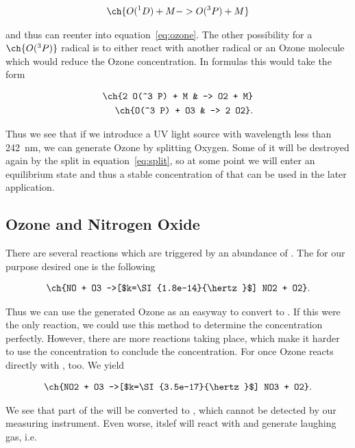 \begin{align*}
  \ch{O(^1 D) + M -> O(^3 P) + M}
\end{align*}

and thus can reenter into equation~\eqref{eq:ozone}. The other
possibility for a $\ch{O(^3 P)}$ radical is to either react with
another radical or an Ozone molecule which would reduce the Ozone
concentration. In formulas this would take the form

\begin{align*}
  \ch{2 O(^3 P) + M & -> O2 + M}\\
  \ch{O(^3 P) + O3 & -> 2 O2}.
\end{align*}

Thus we see that if we introduce a UV light source with wavelength
less than \SI{242}{\nano\meter}, we can generate Ozone
by splitting Oxygen. Some of it will be destroyed again by the split
in equation~\eqref{eq:split}, so at some point we will enter an
equilibrium state and thus a stable concentration of  that can
be used in the later application.

\subsection{Ozone and Nitrogen Oxide}
\label{sec:o-no}

There are several reactions which are triggered by an abundance of
. The for our purpose desired one is the following

\begin{align*}
  \ch{NO + O3 ->[$k=\SI{1.8e-14}{\hertz}$] NO2 + O2}.
\end{align*}

Thus we can use the generated Ozone as an easyway to convert 
to . If this were the only reaction, we could use this method
to determine the  concentration perfectly. However, there are
more reactions taking place, which make it harder to use the 
concentration to conclude the  concentration. For once Ozone
reacts directly with , too. We yield

\begin{align*}
  \ch{NO2 + O3 ->[$k=\SI{3.5e-17}{\hertz}$] NO3 + O2}.
\end{align*}

We see that part of the  will be converted to , which
cannot be detected by our measuring instrument. Even worse, 
itslef will react with  and generate laughing gas, i.e.

